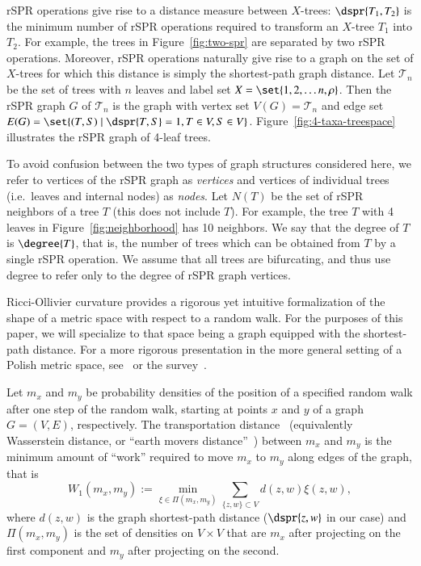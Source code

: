 \documentclass[]{elsarticle}
\begin{document}
rSPR operations give rise to a distance measure between $X$-trees: $\dspr{T_1, T_2}$ is the minimum number of rSPR operations required to transform an $X$-tree $T_1$ into $T_2$.
For example, the trees in Figure~\ref{fig:two-spr} are separated by two rSPR operations.
Moreover, rSPR operations naturally give rise to a graph on the set of $X$-trees for which this distance is simply the shortest-path graph distance.
Let $\mathcal{T}_n$ be the set of trees with $n$ leaves and label set $X = \set{1, 2, \ldots n, \rho}$.
Then the rSPR graph $G$ of $\mathcal{T}_n$ is the graph with vertex set $V(G) = \mathcal{T}_n$ and edge set $E(G) = \set{(T,S) \mid \dspr{T,S} = 1, T \in V, S \in V}$.
Figure~\ref{fig:4-taxa-treespace} illustrates the rSPR graph of 4-leaf trees.

To avoid confusion between the two types of graph structures considered here, we refer to vertices of the rSPR graph as \emph{vertices} and vertices of individual trees (i.e.\ leaves and internal nodes) as \emph{nodes}.
Let $N(T)$ be the set of rSPR neighbors of a tree $T$ (this does not include $T$).
For example, the tree $T$ with 4 leaves in Figure~\ref{fig:neighborhood} has 10 neighbors.
We say that the degree of $T$ is $\degree{T}$, that is, the number of trees which can be obtained from $T$ by a single rSPR operation.
We assume that all trees are bifurcating, and thus use degree to refer only to the degree of rSPR graph vertices.

Ricci-Ollivier curvature provides a rigorous yet intuitive formalization of the shape of a metric space with respect to a random walk.
For the purposes of this paper, we will specialize to that space being a graph equipped with the shortest-path distance.
For a more rigorous presentation in the more general setting of a Polish metric space, see~\citep{Ollivier2009-bw} or the survey~\citep{Ollivier2010-ao}.

Let $m_x$ and $m_y$ be probability densities of the position of a specified random walk after one step of the random walk, starting at points $x$ and $y$ of a graph $G = (V,E)$, respectively.
The transportation distance~\citep{Villani2003-wv} (equivalently Wasserstein distance, or ``earth movers distance''~\citep{rubner2000earth}) between $m_x$ and $m_y$ is the minimum amount of ``work'' required to move $m_x$ to $m_y$ along edges of the graph, that is
\vspace{-0.5em}
\begin{equation}
W_1(m_x, m_y) := \min_{\xi \in \Pi(m_x, m_y)} \sum_{\{z,w\} \subset V} d(z,w) \xi(z,w),
\end{equation}
where $d(z,w)$ is the graph shortest-path distance ($\dspr{z,w}$ in our case) and $\Pi(m_x, m_y)$ is the set of densities on $V \times V$ that are $m_x$ after projecting on the first component and $m_y$ after projecting on the second.
\end{document}
